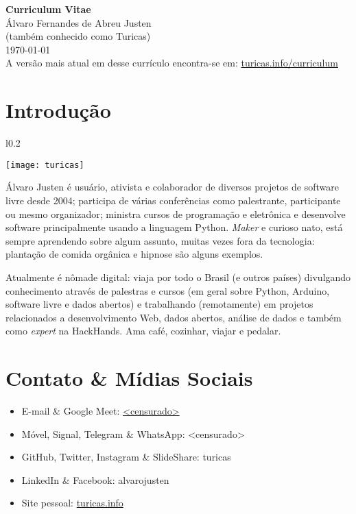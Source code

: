 \documentclass[a4paper,11pt]{article}
\begin{document}
\pagestyle{empty}

\begin{center}
 \huge{\textbf{Curriculum Vitae}}
 \\
 \huge{Álvaro Fernandes de Abreu Justen}
 \\
 \small{(também conhecido como Turicas)}
 \large{\\}
 \large{\today}
 \\
 \small{A versão mais atual em desse currículo encontra-se em:
        \href{http://turicas.info/curriculum}{turicas.info/curriculum}}
\end{center}

\newcommand{\titulo}[1]{\section*{#1}}
\renewcommand{\labelitemi}{$\diamond$}
\renewcommand{\labelitemii}{$\rightarrow$}

\titulo{Introdução}
\begin{wrapfigure}{l}{0.2\textwidth}
	\begin{center}
		\texttt{[image: turicas]}
	\end{center}
\end{wrapfigure}

Álvaro Justen é usuário, ativista e colaborador de diversos projetos de
software livre desde 2004; participa de várias conferências como palestrante,
participante ou mesmo organizador; ministra cursos de programação e eletrônica
e desenvolve software principalmente usando a linguagem Python. \textit{Maker}
e curioso nato, está sempre aprendendo sobre algum assunto, muitas vezes fora
da tecnologia: plantação de comida orgânica e hipnose são alguns exemplos.

Atualmente é nômade digital: viaja por todo o Brasil (e outros países)
divulgando conhecimento através de palestras e cursos (em geral sobre Python,
Arduino, software livre e dados abertos) e trabalhando (remotamente) em
projetos relacionados a desenvolvimento Web, dados abertos, análise de dados e
também como \textit{expert} na HackHands. Ama café, cozinhar, viajar e pedalar.


\titulo{Contato \& Mídias Sociais}
	\begin{itemize}
		\renewcommand{\labelitemi}{}
		\item E-mail \& Google Meet: \url{<censurado>}
		\item Móvel, Signal, Telegram \& WhatsApp: <censurado>
		\item GitHub, Twitter, Instagram \& SlideShare: turicas
		\item LinkedIn \& Facebook: alvarojusten
		\item Site pessoal: \href{http://turicas.info/}{turicas.info}
	\end{itemize}
\end{document}
